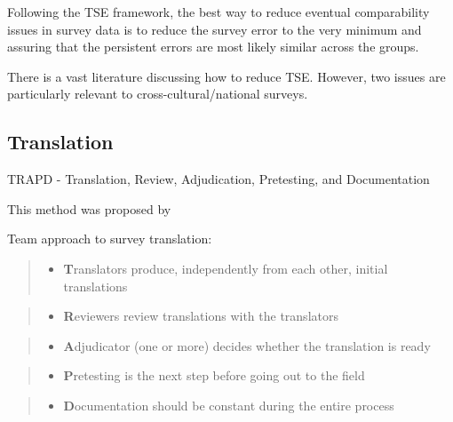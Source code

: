 \documentclass[
]{book}
\providecommand{\tightlist}{%
  \setlength{\itemsep}{0pt}\setlength{\parskip}{0pt}}
\begin{document}
Following the TSE framework, the best way to reduce eventual comparability issues in survey data is to reduce the survey error to the very minimum and assuring that the persistent errors are most likely similar across the groups.

There is a vast literature discussing how to reduce TSE. However, two issues are particularly relevant to cross-cultural/national surveys.

\hypertarget{translation}{%
\subsection{Translation}\label{translation}}

TRAPD - Translation, Review, Adjudication, Pretesting, and Documentation

This method was proposed by \citet{Harkness2003}

Team approach to survey translation:

\begin{quote}
\begin{itemize}
\tightlist
\item
  \textbf{T}ranslators produce, independently from each other, initial translations
\end{itemize}
\end{quote}

\begin{quote}
\begin{itemize}
\tightlist
\item
  \textbf{R}eviewers review translations with the translators
\end{itemize}
\end{quote}

\begin{quote}
\begin{itemize}
\tightlist
\item
  \textbf{A}djudicator (one or more) decides whether the translation is ready
\end{itemize}
\end{quote}

\begin{quote}
\begin{itemize}
\tightlist
\item
  \textbf{P}retesting is the next step before going out to the field
\end{itemize}
\end{quote}

\begin{quote}
\begin{itemize}
\tightlist
\item
  \textbf{D}ocumentation should be constant during the entire process
\end{itemize}
\end{quote}
\end{document}
